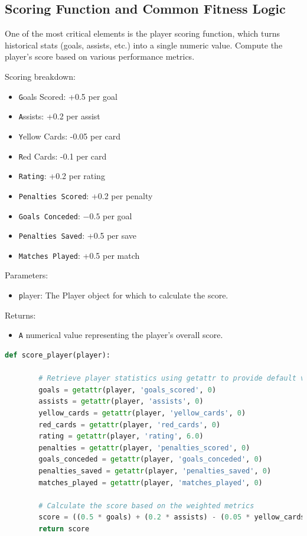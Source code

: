 \documentclass[sigconf]{acmart}
\begin{document}
	\subsection{Scoring Function and Common Fitness Logic}
	\label{sec:score-fitness}
	One of the most critical elements is the player scoring function, which turns historical stats (goals, assists, etc.) into a single numeric value. Compute the player's score based on various performance metrics.
	
	Scoring breakdown:
	\begin{itemize}
		\item \texttt Goals Scored: +0.5 per goal
		\item \texttt Assists: +0.2 per assist
		\item \texttt Yellow Cards: -0.05 per card
		\item \texttt Red Cards: -0.1 per card
		\item \texttt{Rating}: +0.2 per rating
		\item \texttt{Penalties Scored}: +0.2 per penalty
		\item \texttt{Goals Conceded}: $-0.5$ per goal           
		\item \texttt{Penalties Saved}: +0.5 per save             
		\item \texttt{Matches Played}: +0.5 per match            
		
	\end{itemize}
	
	Parameters:
	\begin{itemize}
		\item \texttt player: The Player object for which to calculate the score.
	\end{itemize}
	
	Returns:
	\begin{itemize}
		\item \texttt A numerical value representing the player's overall score.
	\end{itemize}
	
	\begin{lstlisting}[language=Python, caption=Example scoring function in utils.py]
		def score_player(player):
		
		# Retrieve player statistics using getattr to provide default values if not set
		goals = getattr(player, 'goals_scored', 0)
		assists = getattr(player, 'assists', 0)
		yellow_cards = getattr(player, 'yellow_cards', 0)
		red_cards = getattr(player, 'red_cards', 0)
		rating = getattr(player, 'rating', 6.0)
		penalties = getattr(player, 'penalties_scored', 0)
		goals_conceded = getattr(player, 'goals_conceded', 0)
		penalties_saved = getattr(player, 'penalties_saved', 0)
		matches_played = getattr(player, 'matches_played', 0)
		
		# Calculate the score based on the weighted metrics
		score = ((0.5 * goals) + (0.2 * assists) - (0.05 * yellow_cards) - (0.1 * red_cards) + (0.2 * rating) + (0.2 * penalties)) - (0.5 * goals_conceded) + (0.5 * penalties_saved) + (0.5 * matches_played)
		return score
	\end{lstlisting}
	
\end{document}
